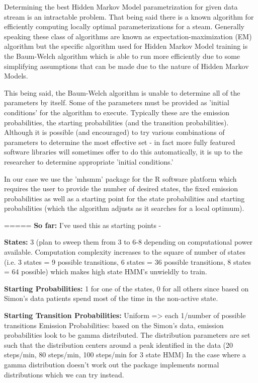 \documentclass[]{article}
\begin{document}
Determining the best Hidden Markov Model parametrization for given data stream is an intractable problem. That being said there is a known algorithm for efficiently computing locally optimal parameterizations for a steam. Generally speaking these class of algorithms are known as expectation-maximization (EM) algorithm but the specific algorithm used for Hidden Markov Model training is the Baum-Welch algorithm which is able to run more efficiently due to some simplifying assumptions that can be made due to the nature of Hidden Markov Models.

This being said, the Baum-Welch algorithm is unable to determine all of the parameters by itself. Some of the parameters must be provided as 'initial conditions' for the algorithm to execute. Typically these are the emission probabilities, the starting probabilities (and the transition probabilities). Although it is possible (and encouraged) to try various combinations of parameters to determine the most effective set - in fact more fully featured software libraries will sometimes offer to do this automatically, it is up to the researcher to determine appropriate 'initial conditions.'

In our case we use the 'mhsmm' package for the R software platform \cite{OConnell2011,OConnell2017} which requires the user to provide the number of desired states, the fixed emission probabilities as well as a starting point for the state probabilities and starting probabilities (which the algorithm adjusts as it searches for a local optimum). 

=====
\textbf{So far:}
I've used this as starting points -

\textbf{States:} 3 (plan to sweep them from 3 to 6-8 depending on computational power available. Computation complexity increases to the square of number of states (i.e. 3 states = 9 possible transitions, 6 states = 36 possible transitions, 8 states = 64 possible) which makes high state HMM's unwieldly to train.

\textbf{Starting Probabilities:} 1 for one of the states, 0 for all others since based on Simon's data patients spend most of the time in the non-active state.

\textbf{Starting Transition Probabilities:} Uniform => each 1/number of possible transitions
Emission Probabilities: based on the Simon's data, emission probabilities look to be gamma distributed. The distribution parameters are set such that the distribution centers around a peak identified in the data (20 steps/min, 80 steps/min, 100 steps/min for 3 state HMM)
In the case where a gamma distribution doesn't work out the package implements normal distributions which we can try instead.
\end{document}

